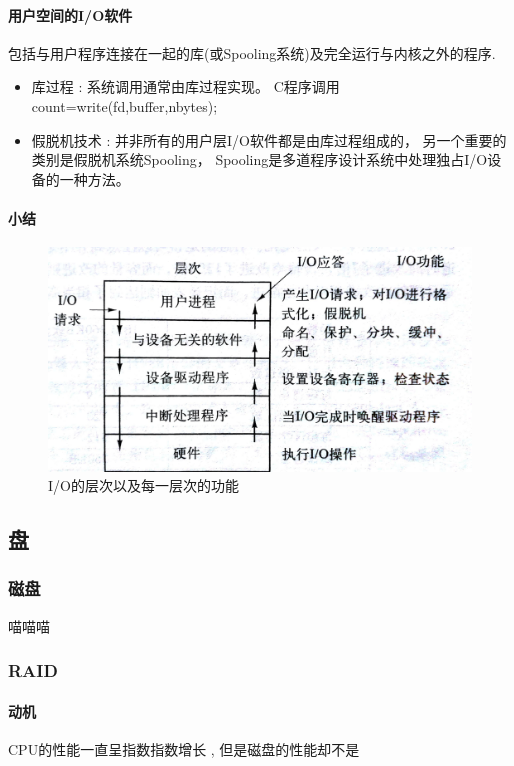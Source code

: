 \documentclass[UTF8,a4paper]{ctexart}
\begin{document}
\paragraph{用户空间的I/O软件}包括与用户程序连接在一起的库(或Spooling系统)及完全运行与内核之外的程序.
\begin{itemize}	
	\item 库过程 : 系统调用通常由库过程实现。 C程序调用 count=write(fd,buffer,nbytes);
	\item 假脱机技术 : 并非所有的用户层I/O软件都是由库过程组成的，
另一个重要的类别是假脱机系统Spooling， Spooling是多道程序设计系统中处理独占I/O设备的一种方法。
\end{itemize}

\paragraph{小结} 

\begin{figure}[H]
	\centering
	\includegraphics[scale = 0.1]{assets/ModernOperatingSystems/2018-01-10-17-11-23.png}
	\caption{I/O的层次以及每一层次的功能}
\end{figure}

\subsection{盘}
\subsubsection{磁盘}
喵喵喵

\subsubsection{RAID}
\paragraph{动机} CPU的性能一直呈指数指数增长 , 但是磁盘的性能却不是
\end{document}
